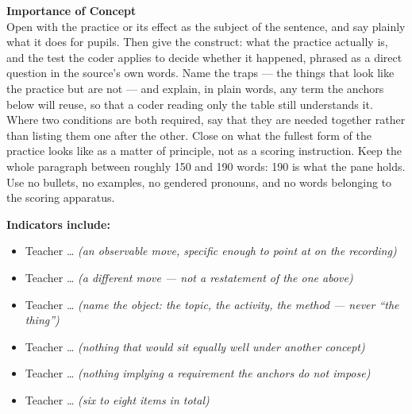 \documentclass[10pt,a4paper]{article}
\newcommand{\twopane}[2]{%
  \noindent
  \begin{minipage}[t]{0.475\linewidth}\RaggedRight
    {\bfseries\small Importance of Concept}\\[1.4mm]
    \footnotesize #1 \normalsize
  \end{minipage}\hfill
  \begin{minipage}[t]{0.475\linewidth}\RaggedRight
    {\bfseries\small Indicators include:}\\[0.6mm]
    #2
  \end{minipage}\\[2mm]}
\begin{document}
\twopane{%
Open with the practice or its effect as the subject of the sentence, and say plainly what it does for pupils.
Then give the construct: what the practice actually is, and the test the coder applies to decide whether it
happened, phrased as a direct question in the source's own words. Name the traps --- the things that look
like the practice but are not --- and explain, in plain words, any term the anchors below will reuse, so that
a coder reading only the table still understands it. Where two conditions are both required, say that they
are needed together rather than listing them one after the other. Close on what the fullest form of the
practice looks like as a matter of principle, not as a scoring instruction. Keep the whole paragraph between
roughly 150 and 190 words: 190 is what the pane holds. Use no bullets, no examples, no gendered pronouns, and
no words belonging to the scoring apparatus.%
}{%
%
%
\footnotesize
\begin{itemize}
  \item Teacher \ldots{} \emph{(an observable move, specific enough to point at on the recording)}
  \item Teacher \ldots{} \emph{(a different move --- not a restatement of the one above)}
  \item Teacher \ldots{} \emph{(name the object: the topic, the activity, the method --- never ``the thing'')}
  \item Teacher \ldots{} \emph{(nothing that would sit equally well under another concept)}
  \item Teacher \ldots{} \emph{(nothing implying a requirement the anchors do not impose)}
  \item Teacher \ldots{} \emph{(six to eight items in total)}
\end{itemize}
\normalsize
}
 
\end{document}
